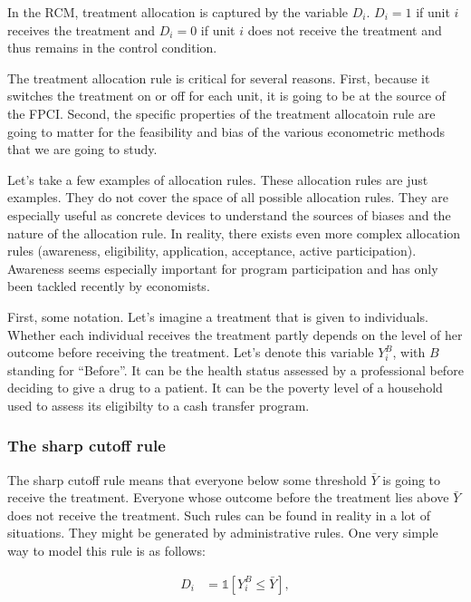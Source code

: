 \documentclass[]{book}
\newcommand{\uns}[1]{\mathds{1}[ #1 ]}
\theoremstyle{definition}
\theoremstyle{definition}
\theoremstyle{definition}
\theoremstyle{remark}
\begin{document}
In the RCM, treatment allocation is captured by the variable \(D_i\).
\(D_i=1\) if unit \(i\) receives the treatment and \(D_i=0\) if unit
\(i\) does not receive the treatment and thus remains in the control
condition.

The treatment allocation rule is critical for several reasons. First,
because it switches the treatment on or off for each unit, it is going
to be at the source of the FPCI. Second, the specific properties of the
treatment allocatoin rule are going to matter for the feasibility and
bias of the various econometric methods that we are going to study.

Let's take a few examples of allocation rules. These allocation rules
are just examples. They do not cover the space of all possible
allocation rules. They are especially useful as concrete devices to
understand the sources of biases and the nature of the allocation rule.
In reality, there exists even more complex allocation rules (awareness,
eligibility, application, acceptance, active participation). Awareness
seems especially important for program participation and has only been
tackled recently by economists.

First, some notation. Let's imagine a treatment that is given to
individuals. Whether each individual receives the treatment partly
depends on the level of her outcome before receiving the treatment.
Let's denote this variable \(Y^B_i\), with \(B\) standing for
``Before''. It can be the health status assessed by a professional
before deciding to give a drug to a patient. It can be the poverty level
of a household used to assess its eligibilty to a cash transfer program.

\subsubsection{The sharp cutoff rule}\label{the-sharp-cutoff-rule}

The sharp cutoff rule means that everyone below some threshold
\(\bar{Y}\) is going to receive the treatment. Everyone whose outcome
before the treatment lies above \(\bar{Y}\) does not receive the
treatment. Such rules can be found in reality in a lot of situations.
They might be generated by administrative rules. One very simple way to
model this rule is as follows:

\begin{align}\label{eq:cutoff}
  D_i & = \uns{Y_i^B\leq\bar{Y}},
\end{align}
\end{document}
